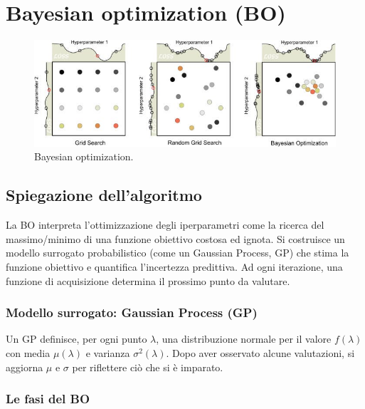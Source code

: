 \documentclass[a4paper,12pt]{report}
\begin{document}
	\section{Bayesian optimization (BO)}
	\begin{figure}[H]
		\centering
		\includegraphics[width=1.0\textwidth]{img/bo.jpg}
		\caption{Bayesian optimization.}
	\end{figure}
	\subsection{Spiegazione dell'algoritmo}
	La BO interpreta l’ottimizzazione degli iperparametri come la ricerca del massimo/minimo di una funzione obiettivo costosa ed ignota. Si costruisce un modello surrogato probabilistico (come un Gaussian Process, GP) che stima la funzione obiettivo e quantifica l’incertezza predittiva. Ad ogni iterazione, una funzione di acquisizione determina il prossimo punto da valutare.
	
	\subsubsection{Modello surrogato: Gaussian Process (GP)}
	Un GP definisce, per ogni punto $\lambda$, una distribuzione normale per il valore $f(\lambda)$ con media $\mu(\lambda)$ e varianza $\sigma^2(\lambda)$. Dopo aver osservato alcune valutazioni, si aggiorna $\mu$ e $\sigma$ per riflettere ciò che si è imparato.
	
	\subsubsection{Le fasi del BO}
	
\end{document}
